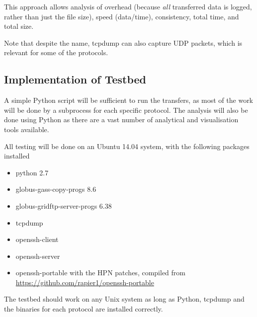 \documentclass{sig-alternate-05-2015}
\begin{document}
This approach allows analysis of overhead (because \textit{all} transferred data is logged, rather than just the file size), speed (data/time), consistency, total time, and total size.

Note that despite the name, tcpdump can also capture UDP packets, which is relevant for some of the protocols.

\subsection{Implementation of Testbed}
A simple Python script will be sufficient to run the transfers, as most of the work will be done by a subprocess for each specific protocol. The analysis will also be done using Python as there are a vast number of analytical and visualisation tools available.

All testing will be done on an Ubuntu 14.04 system, with the following packages installed
\begin{itemize}
	\item python 2.7
	\item globus-gass-copy-progs 8.6
	\item globus-gridftp-server-progs 6.38
	\item tcpdump
	\item openssh-client
	\item openssh-server
	\item openssh-portable with the HPN patches, compiled from \url{https://github.com/rapier1/openssh-portable}
\end{itemize}
The testbed should work on any Unix system as long as Python, tcpdump and the binaries for each protocol are installed correctly.
\end{document}
